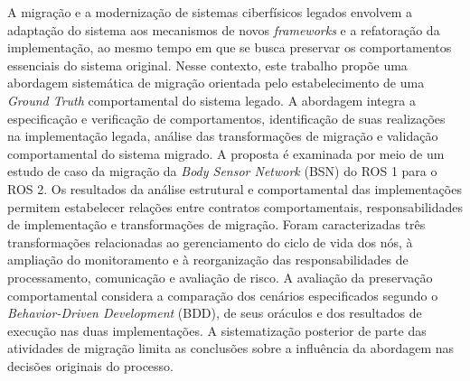 A migração e a modernização de sistemas ciberfísicos legados envolvem a adaptação do sistema aos mecanismos de novos \textit{frameworks} e a refatoração da implementação, ao mesmo tempo em que se busca preservar os comportamentos essenciais do sistema original. Nesse contexto, este trabalho propõe uma abordagem sistemática de migração orientada pelo estabelecimento de uma \textit{Ground Truth} comportamental do sistema legado. A abordagem integra a especificação e verificação de comportamentos, identificação de suas realizações na implementação legada, análise das transformações de migração e validação comportamental do sistema migrado. A proposta é examinada por meio de um estudo de caso da migração da \textit{Body Sensor Network} (BSN) do ROS 1 para o ROS 2. Os resultados da análise estrutural e comportamental das implementações permitem estabelecer relações entre contratos comportamentais, responsabilidades de implementação e transformações de migração. Foram caracterizadas três transformações relacionadas ao gerenciamento do ciclo de vida dos nós, à ampliação do monitoramento e à reorganização das responsabilidades de processamento, comunicação e avaliação de risco. A avaliação da preservação comportamental considera a comparação dos cenários especificados segundo o \textit{Behavior-Driven Development} (BDD), de seus oráculos e dos resultados de execução nas duas implementações. A sistematização posterior de parte das atividades de migração limita as conclusões sobre a influência da abordagem nas decisões originais do processo.